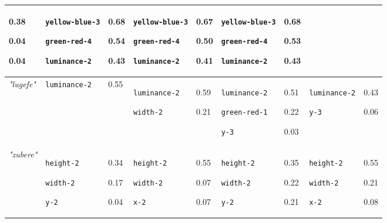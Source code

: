 {\begin{tabular}{@{}p{1.2cm}|p{2.75cm}@{}p{0.8cm}@{}|p{2.75cm}@{}p{0.8cm}@{}|p{2.75cm}@{}p{0.8cm}@{}|p{2.75cm}@{}p{0.8cm}@{}}
0.38

0.04

0.04 & \texttt{yellow-blue-3}

\texttt{green-red-4}

\texttt{luminance-2} & 0.68

0.54

0.43 & \texttt{yellow-blue-3}

\texttt{green-red-4}

\texttt{luminance-2} & 0.67

0.50

0.41 & \texttt{yellow-blue-3}

\texttt{green-red-4}

\texttt{luminance-2} & 0.68

0.53

0.43\\
\hline
\textit{"lugefe"} & \texttt{luminance-2} & 0.55 & \texttt{luminance-2}

\texttt{width-2} & 0.59

0.21 & \texttt{luminance-2}

\texttt{green-red-1}

\texttt{y-3} & 0.51

0.22

0.03 & \texttt{luminance-2}

\texttt{y-3} & 0.43

0.06\\
\hline
\textit{"zubere"} & \texttt{height-2}

\texttt{width-2}

\texttt{y-2} & 0.34

0.17

0.04 & \texttt{height-2}

\texttt{width-2}

\texttt{x-2} & 0.55

0.07

0.07 & \texttt{height-2}

\texttt{width-2}

\texttt{y-2} & 0.35

0.22

0.21 & \texttt{height-2}

\texttt{width-2}

\texttt{x-2} & 0.55

0.21

0.08
\end{tabular}}

